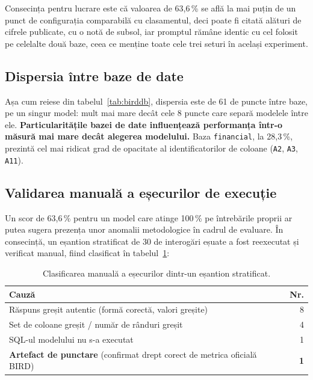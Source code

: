 \documentclass[12pt,a4paper]{report}
\newcommand{\hd}[1]{\textbf{#1}}
\newcommand{\code}[1]{\texttt{\small #1}}
\begin{document}
Consecința pentru lucrare este că valoarea de 63,6\,\% se află la mai puțin
de un punct de configurația comparabilă cu clasamentul, deci poate fi citată
alături de cifrele publicate, cu o notă de subsol, iar promptul rămâne
identic cu cel folosit pe celelalte două baze, ceea ce menține toate cele
trei seturi în același experiment.

\subsection{Dispersia între baze de date}

\begin{table}[H]
\centering
\caption{Acuratețea pe fiecare dintre cele 11 baze BIRD.}
\label{tab:birddb}
\footnotesize

\end{table}

Așa cum reiese din tabelul~\ref{tab:birddb}, dispersia este de 61 de puncte între baze, pe un singur model: mult mai
mare decât cele 8 puncte care separă modelele între ele. \textbf{Particularitățile bazei de date influențează
performanța într-o măsură mai mare decât alegerea modelului.} Baza \code{financial}, la 28,3\,\%, prezintă
cel mai ridicat grad de opacitate al identificatorilor de coloane (\code{A2}, \code{A3}, \code{A11}).

\subsection{Validarea manuală a eșecurilor de execuție}

Un scor de 63,6\,\% pentru un model care atinge 100\,\% pe întrebările
proprii ar putea sugera prezența unor anomalii metodologice în cadrul de evaluare. În consecință,
un eșantion stratificat de 30 de interogări eșuate a fost reexecutat și verificat manual,
fiind clasificat în tabelul~\ref{tab:misses}:

\begin{table}[H]
\centering
\caption{Clasificarea manuală a eșecurilor dintr-un eșantion stratificat.}
\label{tab:misses}
\footnotesize
\begin{tabular}{@{}lr@{}}
\toprule
\hd{Cauză} & \hd{Nr.} \\
\midrule
Răspuns greșit autentic (formă corectă, valori greșite) & 8 \\
Set de coloane greșit / număr de rânduri greșit & 4 \\
SQL-ul modelului nu s-a executat & 1 \\
\textbf{Artefact de punctare} (confirmat drept corect de metrica oficială BIRD) & \textbf{1} \\
\bottomrule
\end{tabular}
\end{table}
\end{document}
